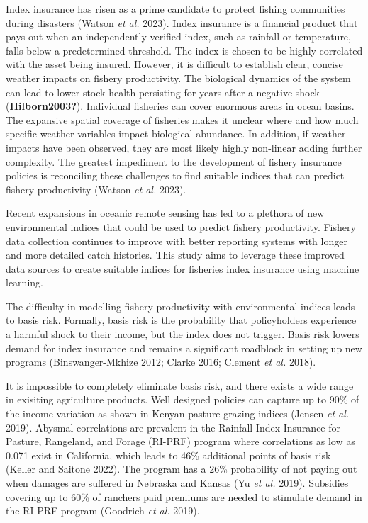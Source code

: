 \documentclass[
  letterpaper,
  DIV=11,
  numbers=noendperiod]{scrartcl}
\begin{document}
Index insurance has risen as a prime candidate to protect fishing
communities during disasters (Watson \emph{et al.} 2023). Index
insurance is a financial product that pays out when an independently
verified index, such as rainfall or temperature, falls below a
predetermined threshold. The index is chosen to be highly correlated
with the asset being insured. However, it is difficult to establish
clear, concise weather impacts on fishery productivity. The biological
dynamics of the system can lead to lower stock health persisting for
years after a negative shock (\textbf{Hilborn2003?}). Individual
fisheries can cover enormous areas in ocean basins. The expansive
spatial coverage of fisheries makes it unclear where and how much
specific weather variables impact biological abundance. In addition, if
weather impacts have been observed, they are most likely highly
non-linear adding further complexity. The greatest impediment to the
development of fishery insurance policies is reconciling these
challenges to find suitable indices that can predict fishery
productivity (Watson \emph{et al.} 2023).

Recent expansions in oceanic remote sensing has led to a plethora of new
environmental indices that could be used to predict fishery
productivity. Fishery data collection continues to improve with better
reporting systems with longer and more detailed catch histories. This
study aims to leverage these improved data sources to create suitable
indices for fisheries index insurance using machine learning.

The difficulty in modelling fishery productivity with environmental
indices leads to basis risk. Formally, basis risk is the probability
that policyholders experience a harmful shock to their income, but the
index does not trigger. Basis risk lowers demand for index insurance and
remains a significant roadblock in setting up new programs
(Binswanger-Mkhize 2012; Clarke 2016; Clement \emph{et al.} 2018).

It is impossible to completely eliminate basis risk, and there exists a
wide range in exisiting agriculture products. Well designed policies can
capture up to 90\% of the income variation as shown in Kenyan pasture
grazing indices (Jensen \emph{et al.} 2019). Abysmal correlations are
prevalent in the Rainfall Index Insurance for Pasture, Rangeland, and
Forage (RI-PRF) program where correlations as low as 0.071 exist in
California, which leads to 46\% additional points of basis risk (Keller
and Saitone 2022). The program has a 26\% probability of not paying out
when damages are suffered in Nebraska and Kansas (Yu \emph{et al.}
2019). Subsidies covering up to 60\% of ranchers paid premiums are
needed to stimulate demand in the RI-PRF program (Goodrich \emph{et al.}
2019).
\end{document}

